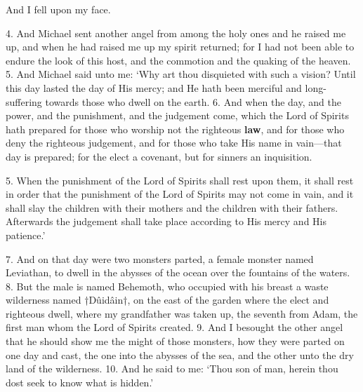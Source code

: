 And I fell upon my face.

4. And Michael sent another angel from among the
holy ones and he raised me up, and when he had
raised me up my spirit returned; for I had not
been able to endure the look of this host, and the
commotion and the quaking of the heaven. 5. And
Michael said unto me: ‘Why art thou disquieted
with such a vision? Until this day lasted the day
of His mercy; and He hath been merciful and long-suffering
towards those who dwell on the earth.
6. And when the day, and the power, and the punishment,
and the judgement come, which the Lord of
Spirits hath prepared for those who worship not the
righteous \textbf{law}, and for those who deny the righteous
judgement, and for those who take His name in
vain—that day is prepared; for the elect a covenant,
but for sinners an inquisition.

5. When the punishment of the Lord of Spirits
shall rest upon them, it shall rest in order that the
punishment of the Lord of Spirits may not come in
vain, and it shall slay the children with their mothers
and the children with their fathers. Afterwards the
judgement shall take place according to His mercy and
His patience.’

7. And on that day were two monsters parted, a
female monster named Leviathan, to dwell in the
abysses of the ocean over the fountains of the waters.
8. But the male is named Behemoth, who occupied
with his breast a waste wilderness named †Dûidâin†,
on the east of the garden where the elect and righteous
dwell, where my grandfather was taken up, the
seventh from Adam, the first man whom the Lord
of Spirits created. 9. And I besought the other
angel that he should show me the might of those
monsters, how they were parted on one day and cast,
the one into the abysses of the sea, and the other
unto the dry land of the wilderness. 10. And he
said to me: ‘Thou son of man, herein thou dost seek
to know what is hidden.’


